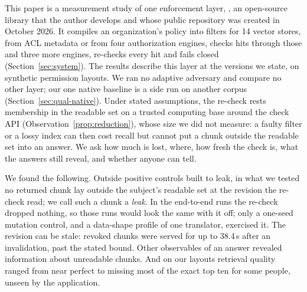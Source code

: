 This paper is a measurement study of one enforcement layer, \sys{}, an open-source library that the author develops and
whose public repository was created in October 2026. It compiles an organization's policy into filters for 14 vector
stores, from ACL metadata or from four authorization engines, checks hits through those and three more engines, re-checks
every hit and fails closed (Section~\ref{sec:system}). The results describe this layer at the versions we state, on
synthetic permission layouts. We ran no adaptive adversary and compare no other layer; our one native baseline is a side
run on another corpus (Section~\ref{sec:qual-native}). Under stated assumptions, the
re-check rests membership in the readable set on a trusted computing base around the check API
(Observation~\ref{prop:reduction}), whose size we did not measure: a faulty
filter or a lossy index can then cost recall but cannot put a chunk outside the readable set into an answer. We ask how much is lost, where, how fresh the check is, what the answers still reveal, and whether anyone can tell.

We found the following. Outside positive controls built to leak, in what we tested no returned chunk lay outside the subject's readable set at the revision the
re-check read; we call such a chunk a \emph{leak}. In the end-to-end runs the re-check dropped nothing, so those runs would
look the same with it off; only a one-seed mutation control, and a data-shape profile of one translator, exercised it. The
revision can be stale: revoked chunks were served for up to 38.4\,s after an invalidation, past the stated
bound. Other observables of an answer revealed information about unreadable chunks. And on our
layouts retrieval quality ranged from near perfect to missing most of the exact top ten for some people, unseen by the application.

